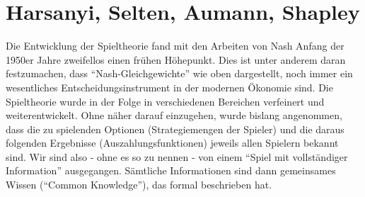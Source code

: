 \section{Harsanyi, Selten, Aumann, Shapley}

Die Entwicklung der Spieltheorie fand mit den Arbeiten von Nash Anfang der 1950er Jahre zweifellos einen frühen Höhepunkt. Dies ist unter anderem daran festzumachen, dass "`Nash-Gleichgewichte"' wie oben dargestellt, noch immer ein wesentliches Entscheidungsinstrument in der modernen Ökonomie sind. Die Spieltheorie wurde in der Folge in verschiedenen Bereichen verfeinert und weiterentwickelt. Ohne näher darauf einzugehen, wurde bislang angenommen, dass die zu spielenden Optionen (Strategiemengen der Spieler) und die daraus folgenden Ergebnisse (Auszahlungsfunktionen) jeweils allen Spielern bekannt sind. Wir sind also - ohne es so zu nennen - von einem "`Spiel mit vollständiger Information"' ausgegangen. Sämtliche Informationen sind dann gemeinsames Wissen ("`Common Knowledge"'), das \textcite{Aumann1976} formal beschrieben hat.

